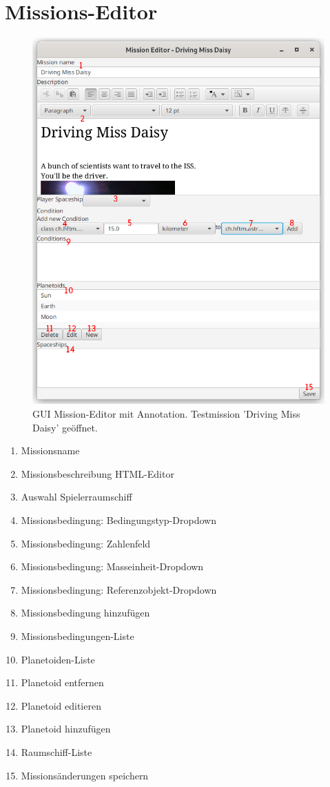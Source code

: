 \hypertarget{missioneditor}{\section{Missions-Editor}}

\begin{figure}[H]
	\centering
	\includegraphics[width=12cm]{res/missioneditor.png}
	\caption{GUI Mission-Editor mit Annotation. Testmission 'Driving Miss Daisy' geöffnet.}
\end{figure}

\begin{enumerate}[noitemsep]
	\item Missionsname
	\item Missionsbeschreibung HTML-Editor
	\item Auswahl Spielerraumschiff
	\item Missionsbedingung: Bedingungstyp-Dropdown
	\item Missionsbedingung: Zahlenfeld
	\item Missionsbedingung: Masseinheit-Dropdown
	\item Missionsbedingung: Referenzobjekt-Dropdown
	\item Missionsbedingung hinzufügen
	\item Missionsbedingungen-Liste
	\item Planetoiden-Liste
	\item Planetoid entfernen
	\item Planetoid editieren
	\item Planetoid hinzufügen
	\item Raumschiff-Liste
	\item Missionsänderungen speichern
\end{enumerate}

